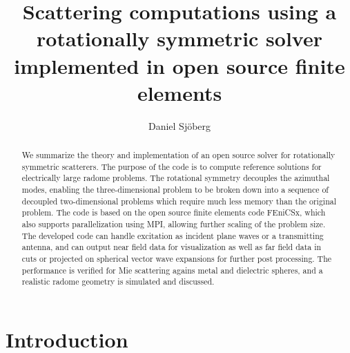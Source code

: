\documentclass[a4paper,12pt]{article}
\title{Scattering computations using a rotationally symmetric solver
  implemented in open source finite elements}
\author{Daniel Sj\"oberg}
\begin{document}
\maketitle

\begin{abstract}
  We summarize the theory and implementation of an open source solver
  for rotationally symmetric scatterers. The purpose of the code is to
  compute reference solutions for electrically large radome
  problems. The rotational symmetry decouples the azimuthal modes,
  enabling the three-dimensional problem to be broken down into a
  sequence of decoupled two-dimensional problems which require much
  less memory than the original problem. The code is based on the open
  source finite elements code FEniCSx, which also supports
  parallelization using MPI, allowing further scaling of the problem
  size. The developed code can handle excitation as incident plane
  waves or a transmitting antenna, and can output near field data for
  visualization as well as far field data in cuts or projected on
  spherical vector wave expansions for further post processing. The
  performance is verified for Mie scattering agains metal and
  dielectric spheres, and a realistic radome geometry is simulated and
  discussed.
\end{abstract}


\section{Introduction}








\end{document}
